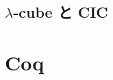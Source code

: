 \documentclass[11pt]{jsreport}
\theoremstyle{mystyle}
\newcommand{\ra}{\rightarrow}
\newcommand{\0}{\textbf{0}}
\newcommand{\1}{\textbf{1}}
\newcommand{\2}{\textbf{2}}
\begin{document}
\subsection{$\lambda$-cube と CIC}
%

\section{Coq} \label{sec coq}
\end{document}
